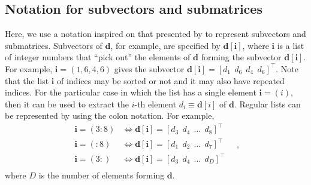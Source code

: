 \subsection{Notation for subvectors and submatrices}

Here, we use a notation inspired on that presented by \cite[][p. 4]{vanloan1992} to represent subvectors and submatrices.
Subvectors of $\mathbf{d}$, for example, are specified by $\mathbf{d}[\mathbf{i}]$, where $\mathbf{i}$ is a
list of integer numbers that ``pick out'' the elements of $\mathbf{d}$ forming the subvector $\mathbf{d}[\mathbf{i}]$.
For example, $\mathbf{i} = (1, 6, 4, 6)$ gives the subvector $\mathbf{d}[\mathbf{i}] = [ d_{1} \:\: d_{6} \:\: d_{4} \:\: d_{6} ]^{\top} $.
Note that the list $\mathbf{i}$ of indices may be sorted or not and it may also have repeated indices.
For the particular case in which the list has a single element $\mathbf{i} = (i)$, then it can be used to extract the $i$-th element 
$d_{i} \equiv \mathbf{d}[i]$ of $\mathbf{d}$.
Regular lists can be represented by using the colon notation. For example, 
\begin{equation*}
	\begin{split}
		\mathbf{i} = (3:8) &\Leftrightarrow \mathbf{d}[\mathbf{i}] = [ d_{3} \:\: d_{4} \:\: \dots \:\: d_{8} ]^{\top} \\
		\mathbf{i} = (:8) &\Leftrightarrow \mathbf{d}[\mathbf{i}] = [ d_{1} \:\: d_{2} \:\: \dots \:\: d_{7} ]^{\top} \\
		\mathbf{i} = (3:) &\Leftrightarrow \mathbf{d}[\mathbf{i}] = [ d_{3} \:\: d_{4} \:\: \dots \:\: d_{D} ]^{\top} \\
	\end{split} \quad ,
\end{equation*}
where $D$ is the number of elements forming $\mathbf{d}$.

